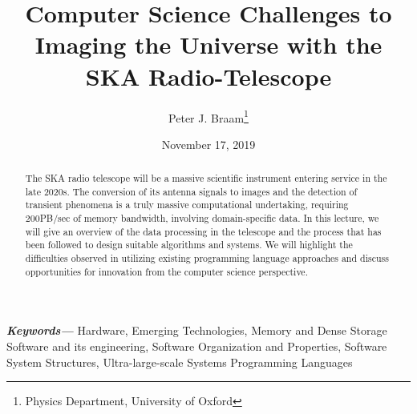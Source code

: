 \documentclass{article}
\title{Computer Science Challenges to Imaging the Universe with the SKA Radio-Telescope}
\author{Peter J. Braam\thanks{Physics Department, University of Oxford}}
\date{November 17, 2019}
\providecommand{\keywords}[1]{\textbf{\textit{Keywords---}} #1}
\begin{document}
\maketitle

\begin{abstract}
	The SKA radio telescope will be a massive scientific instrument entering service in the late 2020s. The conversion of its antenna signals to images and the detection of transient phenomena is a truly massive computational undertaking, requiring 200PB/sec of memory bandwidth, involving domain-specific data. In this lecture, we will give an overview of the data processing in the telescope and the process that has been followed to design suitable algorithms and systems. We will highlight the difficulties observed in utilizing existing programming language approaches and discuss opportunities for innovation from the computer science perspective. 
\end{abstract}

\keywords{Hardware, Emerging Technologies, Memory and Dense Storage
Software and its engineering, Software Organization and Properties, Software System Structures, Ultra-large-scale Systems
Programming Languages}
\end{document}
